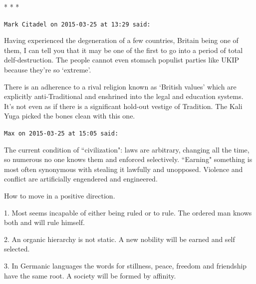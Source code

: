 \begin{center}* * *\end{center}

\begin{footnotesize}\begin{sffamily}



\texttt{Mark Citadel on 2015-03-25 at 13:29 said: }

Having experienced the degeneration of a few countries, Britain being one of them, I can tell you that it may be one of the first to go into a period of total delf-destruction. The people cannot even stomach populist parties like UKIP because they're so `extreme'.

There is an adherence to a rival religion known as `British values' which are explicitly anti-Traditional and enshrined into the legal and education systems. It's not even as if there is a significant hold-out vestige of Tradition. The Kali Yuga picked the bones clean with this one.


\hfill

\texttt{Max on 2015-03-25 at 15:05 said: }

The current condition of ``civilization": laws are arbitrary, changing all the time, so numerous no one knows them and enforced selectively. ``Earning" something is most often synonymous with stealing it lawfully and unopposed. Violence and conflict are artificially engendered and engineered.

How to move in a positive direction.

1. Most seems incapable of either being ruled or to rule. The ordered man knows both and will rule himself.

2. An organic hierarchy is not static. A new nobility will be earned and self selected.

3. In Germanic languages the words for stillness, peace, freedom and friendship have the same root. A society will be formed by affinity.


\end{sffamily}\end{footnotesize}

